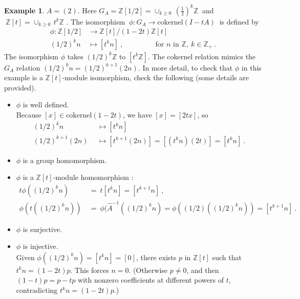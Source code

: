 \documentclass{amsart}
\theoremstyle{definition}
\newtheorem{ex}[equation]{Example}
\theoremstyle{definition}
\newcommand{\Z}{\mathbb Z}
\numberwithin{equation}{subsection}
\begin{document}
\begin{ex}
   $A=(2)$. Here $G_A = \Z[1/2]
=   \cup_{k\geq 0}\, (\frac 12)^k\Z \ $  and
   $\ \Z[t] = \cup_{k\geq 0}\,  t^k \Z$ .
 The isomorphism
   $\ \phi :G_A \to \text{cokernel}(I-tA)\ $ is defined by
   \begin{align*}
  \phi : \Z[1/2] & \to \Z[t]/(1-2t)\Z[t] \   \\
 (1/2)^kn  & \mapsto [t^kn]\ , \qquad \qquad \ \
  \text{for }n \text{ in }\Z, \ k \in \Z_+ \ .
    \end{align*}
   The isomorphism $\phi$  takes
   $(1/2)^k \Z  $ to $[t^k\Z ]$.  The cokernel
   relation mimics the $G_A$
   relation $(1/2)^kn = (1/2)^{k+1}(2n)$.
   In more detail, to check
   that $\phi$  in this example is a $\Z[t]$-module isomorphism,
   check the following (some details are provided).
   \begin{itemize}
   \item
     $\phi$ is well defined. \\ Because
 $[x] \in \text{cokernel}(1-2t)$, we have $[x] = [2tx]$, so
\begin{align*}
 (1/2)^k n \ &\ \mapsto [t^k n]  \\
      (1/2)^{k+1}(2n)\  &\  \mapsto [t^{k+1} (2n)]
     = [(t^kn)(2t)] = [t^kn] \ .
\end{align*}
   \item $\phi$ is a group homomorphism.
   \item $\phi$ is a $\Z[t]$-module homomorphism :
\begin{align*}
t\phi ((1/2)^kn) \ &=\  t[t^kn] = [t^{k+1}n] \ ,  \\
     \phi (t((1/2)^kn))\ & =\ \phi (\hat A^{-1} ((1/2)^kn)
     = \phi ( (1/2)((1/2)^kn)) = [ t^{k+1}n] \  .
\end{align*}
   \item $\phi$ is surjective.
   \item $\phi$ is injective.
     \\
     Given $\phi ((1/2)^kn) = [t^kn]=[0]$, there exists $p$ in $\Z[t]$
     such that $t^kn = (1-2t)p$. This forces $n=0$. (Otherwise  $p\neq 0$,
and then     $(1-t)p=p-tp$
 with nonzero coefficients at different powers of $t$, contradicting
$t^kn = (1-2t)p$.)
   \end{itemize}
   \end{ex}
\end{document}
